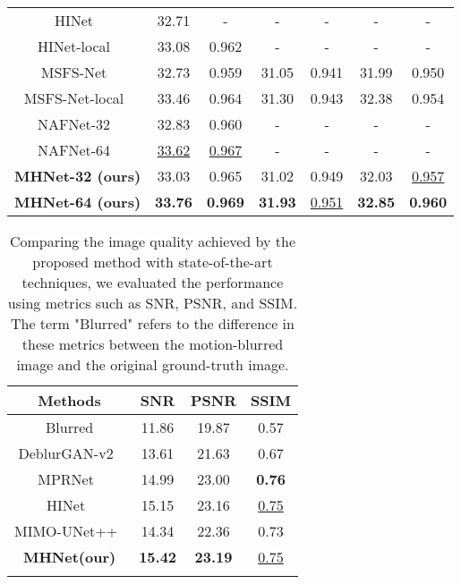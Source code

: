 \documentclass[lettersize,journal]{IEEEtran}
\begin{document}
\begin{table}[ht]
{\begin{tabular}{ccccc||cc}
     \\
    HINet~\cite{Chen_2021_CVPR}&32.71&-&-&-&-&-
    \\
    HINet-local~\cite{Chen_2021_CVPR}&33.08&0.962&-&-&-&-
    \\
    MSFS-Net~\cite{MSFSnet} & 32.73 & 0.959 & 31.05 & 0.941& 31.99 & 0.950 
    \\
    MSFS-Net-local~\cite{MSFSnet} & 33.46 & 0.964 & 31.30 & 0.943 & 32.38 & 0.954 
    \\
    \hline
    NAFNet-32~\cite{chen2022simple}&32.83&0.960&-&-&-&-
    \\
    NAFNet-64~\cite{chen2022simple}&\underline{33.62}&\underline{0.967}&-&-&-&-
    \\
    \hline
    \textbf{MHNet-32 (ours)}&33.03&0.965&31.02&0.949&32.03  &\underline{0.957}
    \\
    \textbf{MHNet-64 (ours)}&\textbf{33.76}&\textbf{0.969}&\textbf{31.93}&\underline{0.951}&\textbf{32.85}  & \textbf{0.960}
    \\
    \hline
\end{tabular}
}

\end{table}

\begin{table}[htb]
\begin{center}
\caption{Comparing the image quality achieved by the proposed method with state-of-the-art techniques, we evaluated the performance using metrics such as SNR, PSNR, and SSIM. The term "Blurred" refers to the difference in these metrics between the motion-blurred image and the original ground-truth image.}
\begin{tabular}{cccc}
\\ \hline
Methods                                  & SNR            & PSNR           & SSIM                            \\ \hline
Blurred                                  & 11.86          & 19.87          & 0.57                            \\
DeblurGAN-v2~\cite{deganv2}                             & 13.61          & 21.63          & 0.67                            \\
MPRNet~\cite{Zamir2021MPRNet}                                   & 14.99          & 23.00          & \textbf{0.76}                   \\
HINet~\cite{Chen_2021_CVPR}                                    & 15.15          & 23.16          & \underline{0.75}                      \\
MIMO-UNet++~\cite{2021Rethinking}                              & 14.34          & 22.36          & 0.73                            \\ \hline
\textbf{MHNet(our)} & \textbf{15.42} & \textbf{23.19} & \underline{0.75} \\ \hline
\label{tb:00200}
\end{tabular}
\end{center}

\end{table}
\end{document}
